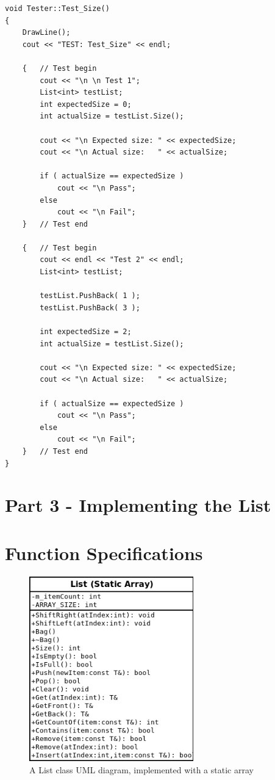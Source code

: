 \begin{lstlisting}[style=code]
void Tester::Test_Size()
{
    DrawLine();
    cout << "TEST: Test_Size" << endl;

    {   // Test begin
        cout << "\n \n Test 1";
        List<int> testList;
        int expectedSize = 0;
        int actualSize = testList.Size();

        cout << "\n Expected size: " << expectedSize;
        cout << "\n Actual size:   " << actualSize;

        if ( actualSize == expectedSize )
            cout << "\n Pass";
        else
            cout << "\n Fail";
    }   // Test end

    {   // Test begin
        cout << endl << "Test 2" << endl;
        List<int> testList;

        testList.PushBack( 1 );
        testList.PushBack( 3 );

        int expectedSize = 2;
        int actualSize = testList.Size();

        cout << "\n Expected size: " << expectedSize;
        cout << "\n Actual size:   " << actualSize;

        if ( actualSize == expectedSize )
            cout << "\n Pass";
        else
            cout << "\n Fail";
    }   // Test end
}
\end{lstlisting}

    \section{Part 3 - Implementing the List}

    \newpage

    \section{Function Specifications}

    \begin{figure}[h]
        \centering
        \includegraphics[height=8cm]{images-2018-01/List.png}
        \caption{A List class UML diagram, implemented with a static array}
    \end{figure}

